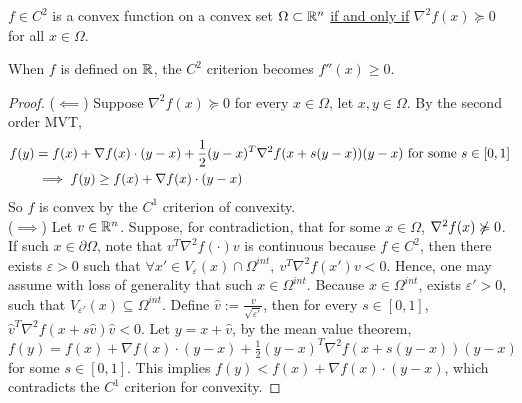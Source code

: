 \documentclass{article}
\begin{document}
    \begin{theorem}
        $f \in C^2$ is a convex function on a convex set $\Omega \subset \mathbb{R}^n$ \ul{if and only if} $\nabla^2 f(x) \succcurlyeq 0$ for all $x \in \Omega$.
    \end{theorem}
    
    \begin{remark}
    	When $f$ is defined on $\mathbb{R}$, the $C^2$ criterion becomes $f''(x) \geq 0$.
    \end{remark}
    
    \begin{proof}
        ($\impliedby$) Suppose $\nabla^2 f(x) \succcurlyeq 0$ for every $x \in \Omega$, let $x, y \in \Omega$. By the second order MVT,
        \begin{align}
        	f(y) &= f(x) + \nabla f(x) \cdot (y - x) + \frac{1}{2} (y-x)^T \nabla^2 f(x + s (y - x)) (y - x)\text{{ for some }} s \in [0, 1] \\
        	&\implies f(y) \geq f(x) + \nabla f(x) \cdot (y - x)
        \end{align}
        So $f$ is convex by the $C^1$ criterion of convexity.\\
        ($\implies$) Let $v \in \mathbb{R}^n$. Suppose, for contradiction, that for some $x \in \Omega$, $\nabla^2 f(x) \centernot \succcurlyeq 0$. If such $x \in \partial \Omega$, note that $v^T \nabla^2 f(\cdot) v$ is continuous because $f \in C^2$, then there exists $\varepsilon > 0$ such that $\forall x' \in V_\varepsilon(x) \cap \Omega^{int},\ v^T \nabla^2 f(x') v < 0$. Hence, one may assume with loss of generality that such $x \in \Omega^{int}$. Because $x \in \Omega^{int}$, exists $\varepsilon' > 0$, such that $V_{\varepsilon'}(x) \subseteq \Omega^{int}$. Define $\hat{v} := \frac{v}{\sqrt{\varepsilon'}}$, then for every $s \in [0, 1]$, $\hat{v}^T \nabla^2 f(x + s\hat{v}) \hat{v} < 0$. Let $y = x + \hat{v}$, by the mean value theorem, $f(y) = f(x) + \nabla f(x) \cdot (y - x) + \frac{1}{2} (y - x)^T \nabla^2 f (x + s (y - x)) (y - x)$ for some $s \in [0, 1]$. This implies $f(y) < f(x) + \nabla f(x) \cdot (y - x)$, which contradicts the $C^1$ criterion for convexity.
    \end{proof}
    
\end{document}
